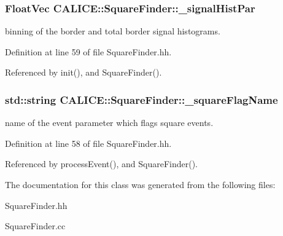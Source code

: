 \subsubsection[{\_\-signalHistPar}]{\setlength{\rightskip}{0pt plus 5cm}FloatVec {\bf CALICE::SquareFinder::\_\-signalHistPar}\hspace{0.3cm}{\ttfamily  [protected]}}\label{classCALICE_1_1SquareFinder_ad1db2cd08984b84ab549c2631b2e679d}


binning of the border and total border signal histograms. 

Definition at line 59 of file SquareFinder.hh.

Referenced by init(), and SquareFinder().
\subsubsection[{\_\-squareFlagName}]{\setlength{\rightskip}{0pt plus 5cm}std::string {\bf CALICE::SquareFinder::\_\-squareFlagName}\hspace{0.3cm}{\ttfamily  [protected]}}\label{classCALICE_1_1SquareFinder_a559678746ea01e5a0b4dc1c09901493d}


name of the event parameter which flags square events. 

Definition at line 58 of file SquareFinder.hh.

Referenced by processEvent(), and SquareFinder().

The documentation for this class was generated from the following files:\begin{DoxyCompactItemize}
\item 
SquareFinder.hh\item 
SquareFinder.cc\end{DoxyCompactItemize}
